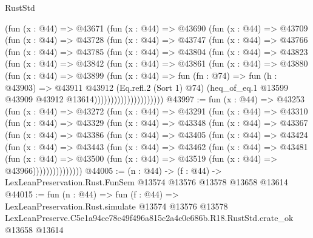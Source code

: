 \begin{lexlean}{RustStd}
\begin{coremodule}
                (fun (x : @44) =>
                @43671
                  (fun (x : @44) =>
                  @43690
                    (fun (x : @44) =>
                    @43709
                      (fun (x : @44) =>
                      @43728
                        (fun (x : @44) =>
                        @43747
                          (fun (x : @44) =>
                          @43766
                            (fun (x : @44) =>
                            @43785
                              (fun (x : @44) =>
                              @43804
                                (fun (x : @44) =>
                                @43823
                                  (fun (x : @44) =>
                                  @43842
                                    (fun (x : @44) =>
                                    @43861
                                      (fun (x : @44) =>
                                      @43880
                                        (fun (x : @44) =>
                                        @43899
                                          (fun (x : @44) =>
                                          fun (fn : @74) =>
                                          fun (h : @43903) =>
                                          @43911
                                            @43912
                                            (Eq.refl.{2} (Sort 1) @74)
                                            (heq_of_eq.{1}
                                              @13599
                                              @43909
                                              @43912
                                              @13614)))))))))))))))))))))
@43997 := fun (x : @44) =>
  @43253
    (fun (x : @44) =>
    @43272
      (fun (x : @44) =>
      @43291
        (fun (x : @44) =>
        @43310
          (fun (x : @44) =>
          @43329
            (fun (x : @44) =>
            @43348
              (fun (x : @44) =>
              @43367
                (fun (x : @44) =>
                @43386
                  (fun (x : @44) =>
                  @43405
                    (fun (x : @44) =>
                    @43424
                      (fun (x : @44) =>
                      @43443
                        (fun (x : @44) =>
                        @43462
                          (fun (x : @44) =>
                          @43481
                            (fun (x : @44) =>
                            @43500 (fun (x : @44) => @43519 (fun (x : @44) => @43966)))))))))))))))
@44005 := (n : @44) ->
  (f : @44) -> LexLeanPreservation.Rust.FunSem @13574 @13576 @13578 @13658 @13614
@44015 := fun (n : @44) =>
  fun (f : @44) =>
  LexLeanPreservation.Rust.simulate
    @13574
    @13576
    @13578
    LexLeanPreserve.C5e1a94ce78c49f496a815c2a4c0c686b.R18.RustStd.crate_ok
    @13658
    @13614
\end{coremodule}
\end{lexlean}
